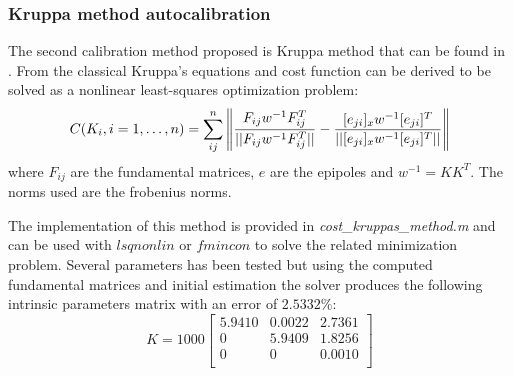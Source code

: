 \documentclass[11pt]{article}
\begin{document}
\subsubsection{Kruppa method autocalibration}
The second calibration method proposed is Kruppa method that can be found in \cite{Prapitasari14} \cite{Pollefeys}. From the classical Kruppa's equations and cost function can be derived to be solved as a nonlinear least-squares optimization problem:
\begin{equation}
    C(K_i, i = 1,\dots, n) = \sum_{ij}^{n} \norm{\frac{F_{ij}w^{-1}F_{ij}^T}{||F_{ij}w^{-1}F_{ij}^T||} - \frac{[e_{ji}]_xw^{-1}[e_{ji}]^T}{||[e_{ji}]_xw^{-1}[e_{ji}]^T||}}
\end{equation}
where $F_{ij}$ are the fundamental matrices, $e$ are the epipoles and $w^{-1} = KK^T$. The norms used are the frobenius norms.

\bigskip
The implementation of this method is provided in \textit{cost\_kruppas\_method.m} and can be used with $lsqnonlin$ or $fmincon$ to solve the related minimization problem. Several parameters has been tested but using the computed fundamental matrices and initial estimation the solver produces the following intrinsic parameters matrix with an error of $2.5332\%$:
    \begin{equation}
        K = 1000 \begin{bmatrix}
     
     5.9410  &  0.0022   & 2.7361\\
          0  &  5.9409   & 1.8256\\
          0  &       0   & 0.0010\\
\end{bmatrix}
\end{equation}
\newpage
\end{document}
